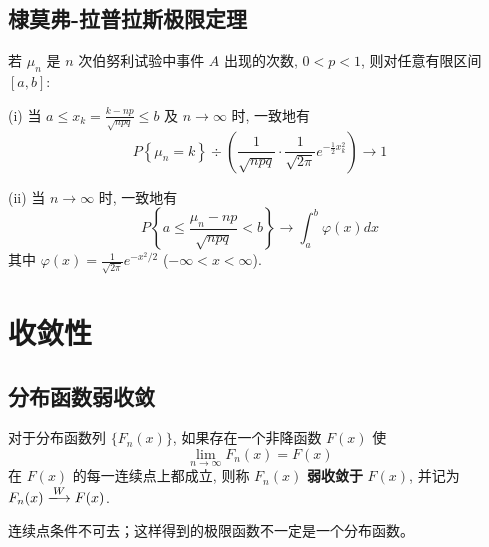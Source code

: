 \subsection{棣莫弗-拉普拉斯极限定理}\label{subsec:棣莫弗-拉普拉斯极限定理}
\begin{theorem}\label{thm:de_moivre_laplace}
    若 $\mu_n$ 是 $n$ 次伯努利试验中事件 $A$ 出现的次数, $0<p<1$, 则对任意有限区间 $[a,b]$:

(i) 当 $a \le x_k = \frac{k-np}{\sqrt{npq}} \le b$ 及 $n\to\infty$ 时, 一致地有
\begin{equation} \label{eq:de_moivre_laplace_point}
P\left\{\mu_n = k\right\} \div \left(\frac{1}{\sqrt{npq}} \cdot \frac{1}{\sqrt{2\pi}} e^{-\frac{1}{2}x_k^2}\right) \to 1
\end{equation}

(ii) 当 $n\to\infty$ 时, 一致地有
\begin{equation} \label{eq:de_moivre_laplace_integral}
P\left\{a \le \frac{\mu_n - np}{\sqrt{npq}} < b\right\} \to \int_a^b \varphi(x) dx
\end{equation}
其中 $\varphi(x)=\frac{1}{\sqrt{2\pi}}e^{-x^2/2}$ ($-\infty < x < \infty$).
\end{theorem}
\section{收敛性}\label{sec:收敛性}
\subsection{分布函数弱收敛}\label{{subsec:分布函数弱收敛}}
\begin{definition}[弱收敛]\label{def:weak_convergence}
    对于分布函数列 $\{F_n(x)\}$, 如果存在一个非降函数 $F(x)$ 使
\begin{equation} \label{eq:weak_convergence}
\lim_{n\to\infty} F_n(x) = F(x)
\end{equation}
在 $F(x)$ 的每一连续点上都成立, 则称 $F_n(x)$ \textbf{弱收敛于} $F(x)$, 并记为 $F_n(x) \xlongrightarrow{W} F(x)$.

\end{definition}

\begin{remark}
    连续点条件不可去；这样得到的极限函数不一定是一个分布函数。
\end{remark}

